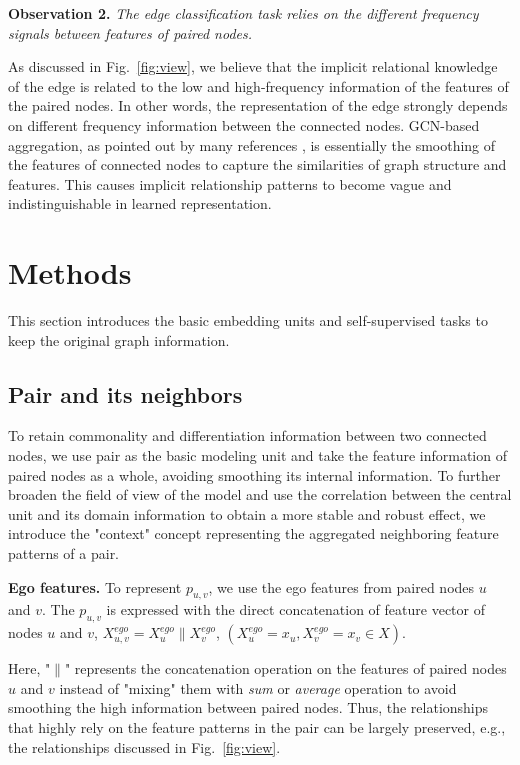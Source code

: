 \documentclass[10pt,journal,compsoc]{IEEEtran}
\begin{document}
\noindent\textbf{Observation 2.} \textit{The edge classification task relies on the different frequency signals between features of paired nodes.}


As discussed in Fig.~\ref{fig:view}, we believe that the implicit relational knowledge of the edge is related to the low and high-frequency information of the features of the paired nodes. In other words, the representation of the edge strongly depends on different frequency information between the connected nodes. GCN-based aggregation, as pointed out by many references \cite{Zhu2020,wu2019simplifying}, is essentially the smoothing of the features of connected nodes\cite{Nt19} to capture the similarities of graph structure and features. This causes implicit relationship patterns to become vague and indistinguishable in learned representation.


\section{Methods}


This section introduces the basic embedding units and self-supervised tasks to keep the original graph information.

\subsection{Pair and its neighbors}

To retain commonality and differentiation information between two connected nodes, we use pair as the basic modeling unit and take the feature information of paired nodes as a whole, avoiding smoothing its internal information. To further broaden the field of view of the model and use the correlation between the central unit and its domain information to obtain a more stable and robust effect, we introduce the "context" concept representing the aggregated neighboring feature patterns of a pair. 



\noindent\textbf{Ego features.} To represent $p_{u,v}$, we use the ego features from paired nodes $u$ and $v$. The $p_{u,v}$ is expressed with the direct concatenation of feature vector of nodes $u$ and $v$, ${X_{u,v}^{ego}=X_{u}^{ego}} \| X_{v}^{ego}$, $(X_{u}^{ego}=x_u, X_{v}^{ego}=x_v\in X)$. 

Here, "$\|$" represents the concatenation operation on the features of paired nodes $u$ and $v$ instead of "mixing" them with \textit{sum} or \textit{average} operation to avoid smoothing the high information between paired nodes. Thus, the relationships that highly rely on the feature patterns in the pair can be largely preserved, e.g., the relationships discussed in Fig.~\ref{fig:view}.
\end{document}
